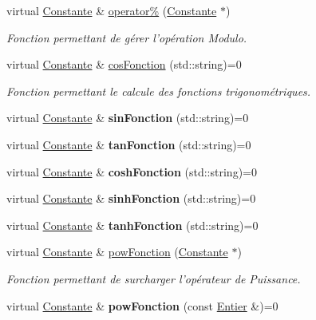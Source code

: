 \begin{DoxyCompactItemize}
\item 
virtual \hyperlink{class_constante}{Constante} \& \hyperlink{class_constante_a9234f524cc1b97560236afe686c4767a}{operator\%} (\hyperlink{class_constante}{Constante} $\ast$)
\begin{DoxyCompactList}\small\item\em Fonction permettant de gérer l'opération Modulo. \end{DoxyCompactList}\item 
virtual \hyperlink{class_constante}{Constante} \& \hyperlink{class_constante_a62ac7c7b4f04706ef930728736ee45ae}{cos\-Fonction} (std\-::string)=0
\begin{DoxyCompactList}\small\item\em Fonction permettant le calcule des fonctions trigonométriques. \end{DoxyCompactList}\item 
\hypertarget{class_constante_adf047fc87a4bc192ca159ad1711effb2}{virtual \hyperlink{class_constante}{Constante} \& {\bfseries sin\-Fonction} (std\-::string)=0}\label{class_constante_adf047fc87a4bc192ca159ad1711effb2}

\item 
\hypertarget{class_constante_ac527584889c9865e0dc80e4c22f6fc73}{virtual \hyperlink{class_constante}{Constante} \& {\bfseries tan\-Fonction} (std\-::string)=0}\label{class_constante_ac527584889c9865e0dc80e4c22f6fc73}

\item 
\hypertarget{class_constante_ae0bf50b47928dc108de2f29231aefbeb}{virtual \hyperlink{class_constante}{Constante} \& {\bfseries cosh\-Fonction} (std\-::string)=0}\label{class_constante_ae0bf50b47928dc108de2f29231aefbeb}

\item 
\hypertarget{class_constante_adbdbe6e979fcdf68d2c38c8114d0dde6}{virtual \hyperlink{class_constante}{Constante} \& {\bfseries sinh\-Fonction} (std\-::string)=0}\label{class_constante_adbdbe6e979fcdf68d2c38c8114d0dde6}

\item 
\hypertarget{class_constante_a79f9e32d8dfe2980f9ad17733d5905fb}{virtual \hyperlink{class_constante}{Constante} \& {\bfseries tanh\-Fonction} (std\-::string)=0}\label{class_constante_a79f9e32d8dfe2980f9ad17733d5905fb}

\item 
virtual \hyperlink{class_constante}{Constante} \& \hyperlink{class_constante_a6218e67aef6b06f29d37b112206d56c6}{pow\-Fonction} (\hyperlink{class_constante}{Constante} $\ast$)
\begin{DoxyCompactList}\small\item\em Fonction permettant de surcharger l'opérateur de Puissance. \end{DoxyCompactList}\item 
\hypertarget{class_constante_a4de24bbfec26b381782d54f86699f5db}{virtual \hyperlink{class_constante}{Constante} \& {\bfseries pow\-Fonction} (const \hyperlink{class_entier}{Entier} \&)=0}\label{class_constante_a4de24bbfec26b381782d54f86699f5db}


\end{DoxyCompactItemize}
